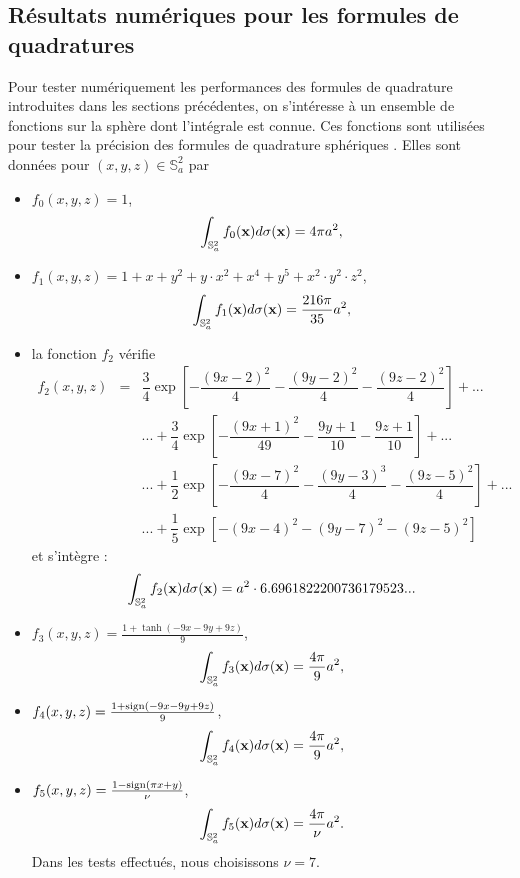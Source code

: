 \subsection{Résultats numériques pour les formules de quadratures}

Pour tester numériquement les performances des formules de quadrature introduites dans les sections précédentes, on s’intéresse à un ensemble de fonctions sur la sphère dont l'intégrale est connue. Ces fonctions sont utilisées pour tester la précision des formules de quadrature sphériques \cite{Fornberg2014}. Elles sont données pour $(x,y,z) \in \mathbb{S}_a^2$ par
\begin{itemize}
\item $f_0(x,y,z)=1$,
\begin{equation}
\displaystyle\int_{\mathbb{S}_a^2} f_0(\mathbf{x}) d\sigma (\mathbf{x})=4 \pi a^2,
\end{equation}
\item $f_1(x,y,z)=1+x+y^2+y\cdot x^2+x^4+y^5+x^2 \cdot y^2 \cdot z^2$,
\begin{equation}
\displaystyle\int_{\mathbb{S}_a^2} f_1(\mathbf{x}) d\sigma (\mathbf{x})=\dfrac{216 \pi}{35} a^2,
\end{equation}
\item la fonction $f_2$ vérifie 
\begin{equation}
\begin{array}{rcl}
f_2(x,y,z) & = & \dfrac{3}{4} \exp \left[ - \dfrac{(9x-2)^2}{4} - \dfrac{(9y-2)^2}{4} - \dfrac{(9z-2)^2}{4} \right] + ...\\
& & ... + \dfrac{3}{4} \exp \left[ - \dfrac{(9x+1)^2}{49} - \dfrac{9y+1}{10} - \dfrac{9z+1}{10} \right] + ...\\
& & ... + \dfrac{1}{2} \exp \left[ - \dfrac{(9x-7)^2}{4} - \dfrac{(9y-3)^3}{4} - \dfrac{(9z-5)^2}{4} \right] + ...\\
& &... + \dfrac{1}{5} \exp \left[ - (9x-4)^2 - (9y-7)^2 - (9z-5)^2 \right]
\end{array}
\end{equation}
et s'intègre :
\begin{equation}
\displaystyle\int_{\mathbb{S}_a^2} f_2(\mathbf{x}) d\sigma (\mathbf{x})=a^2 \cdot 6.6961822200736179523...
\end{equation}
\item $f_3(x,y,z)=\frac{1+\tanh(-9x-9y+9z)}{9}$,
\begin{equation}
\displaystyle\int_{\mathbb{S}_a^2} f_3(\mathbf{x}) d\sigma (\mathbf{x})=\frac{4\pi}{9} a^2,
\end{equation}
\item $f_4(x,y,z)=\frac{1+\text{sign}(-9x-9y+9z)}{9}$,
\begin{equation}
\displaystyle\int_{\mathbb{S}_a^2} f_4(\mathbf{x}) d\sigma (\mathbf{x})=\frac{4\pi}{9} a^2,
\end{equation}
\item $f_5(x,y,z)=\frac{1-\text{sign}(\pi x + y)}{\nu}$,
\begin{equation}
\displaystyle\int_{\mathbb{S}_a^2} f_5(\mathbf{x}) d\sigma (\mathbf{x})=\frac{4\pi}{\nu} a^2.
\end{equation}
Dans les tests effectués, nous choisissons $\nu = 7$.
\end{itemize}


